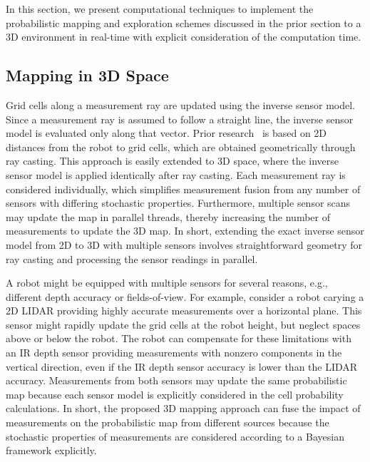 \documentclass[smallextended]{svjour3}       %
\begin{document}
In this section, we present computational techniques to implement the probabilistic mapping and exploration schemes discussed in the prior section to a 3D environment in real-time with explicit consideration of the computation time.

\subsection{Mapping in 3D Space}

Grid cells along a measurement ray are updated using the inverse sensor model. Since a measurement ray is assumed to follow a straight line, the inverse sensor model is evaluated only along that vector. Prior research~\cite{KauLeeAiMos16,KauTakAiLee17} is based on 2D distances from the robot to grid cells, which are obtained geometrically through ray casting. This approach is easily extended to 3D space, where the inverse sensor model is applied identically after ray casting. Each measurement ray is considered individually, which simplifies measurement fusion from any number of sensors with differing stochastic properties. Furthermore, multiple sensor scans may update the map in parallel threads, thereby increasing the number of measurements to update the 3D map. In short, extending the exact inverse sensor model from 2D to 3D with multiple sensors involves straightforward geometry for ray casting and processing the sensor readings in parallel.

A robot might be equipped with multiple sensors for several reasons, e.g., different depth accuracy or fields-of-view. For example, consider a robot carying a 2D LIDAR providing highly accurate measurements over a horizontal plane. This sensor might rapidly update the grid cells at the robot height, but neglect spaces above or below the robot. The robot can compensate for these limitations with an IR depth sensor providing measurements with nonzero components in the vertical direction, even if the IR depth sensor accuracy is lower than the LIDAR accuracy. Measurements from both sensors may update the same probabilistic map because each sensor model is explicitly considered in the cell probability calculations. In short, the proposed 3D mapping approach can fuse the impact of measurements on the probabilistic map from different sources because the stochastic properties of measurements are considered according to a Bayesian framework explicitly.

\end{document}
